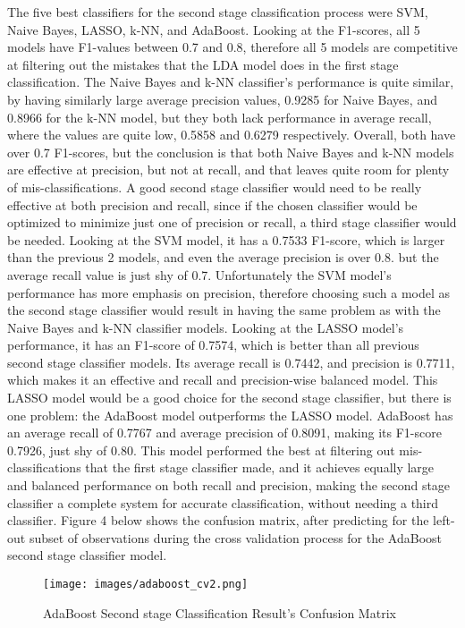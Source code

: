 \documentclass[11pt]{article}
\begin{document}
The five best classifiers for the second stage classification process were SVM, Naive Bayes, LASSO, k-NN, and AdaBoost. Looking at the F1-scores, all 5 models have F1-values between 0.7 and 0.8, therefore all 5 models are competitive at filtering out the mistakes that the LDA model does in the first stage classification. The Naive Bayes and k-NN classifier's performance is quite similar, by having similarly large average precision values, 0.9285 for Naive Bayes, and 0.8966 for the k-NN model, but they both lack performance in average recall, where the values are quite low, 0.5858 and 0.6279 respectively. Overall, both have over 0.7 F1-scores, but the conclusion is that both Naive Bayes and k-NN models are effective at precision, but not at recall, and that leaves quite room for plenty of mis-classifications. A good second stage classifier would need to be really effective at both precision and recall, since if the chosen classifier would be optimized to minimize just one of precision or recall, a third stage classifier would be needed. Looking at the SVM model, it has a 0.7533 F1-score, which is larger than the previous 2 models, and even the average precision is over 0.8. but the average recall value is just shy of 0.7. Unfortunately the SVM model's performance has more emphasis on precision, therefore choosing such a model as the second stage classifier would result in having the same problem as with the Naive Bayes and k-NN classifier models. Looking at the LASSO model's performance, it has an F1-score of 0.7574, which is better than all previous second stage classifier models. Its average recall is 0.7442, and precision is 0.7711, which makes it an effective and recall and precision-wise balanced model. This LASSO model would be a good choice for the second stage classifier, but there is one problem: the AdaBoost model outperforms the LASSO model. AdaBoost has an average recall of 0.7767 and average precision of 0.8091, making its F1-score 0.7926, just shy of 0.80. This model performed the best at filtering out mis-classifications that the first stage classifier made, and it achieves equally large and balanced performance on both recall and precision, making the second stage classifier a complete system for accurate classification, without needing a third classifier. Figure 4 below shows the confusion matrix, after predicting for the left-out subset of observations during the cross validation process for the AdaBoost second stage classifier model.

\begin{figure}[h!]
    \centering
    \texttt{[image: images/adaboost\_cv2.png]}
    \caption{AdaBoost Second stage Classification Result's Confusion Matrix}
    \label{fig:adaBoostCV}
\end{figure}
\end{document}
